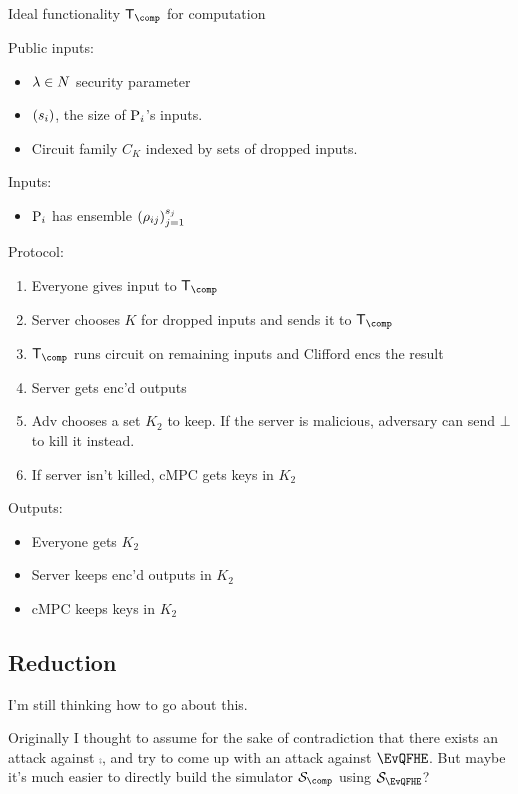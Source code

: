\begin{protocol}{Ideal functionality $\trustp_\comp$ for computation}

	Public inputs:
	\begin{itemize}
		\item $\lambda\in\relax{N}$ security parameter
		\item $\left(s_i\right)$, the size of $\operatorname{P}_i$'s inputs.
		\item Circuit family $C_K$ indexed by sets of dropped inputs.
	\end{itemize}

	Inputs:
	\begin{itemize}
		\item $\operatorname{P}_i$ has ensemble $\left(\rho_{ij}\right)_{j=1}^{s_j}$
	\end{itemize}

	Protocol:
	\begin{enumerate}
		\item Everyone gives input to $\trustp_\comp$
		\item Server chooses $K$ for dropped inputs and sends it to $\trustp_\comp$
		\item $\trustp_\comp$ runs circuit on remaining inputs and Clifford encs the result
		\item Server gets enc'd outputs
		\item Adv chooses a set $K_2$ to keep. If the server is malicious, adversary can send $\bot$ to kill it instead.
		\item If server isn't killed, cMPC gets keys in $K_2$
	\end{enumerate}

	Outputs:
	\begin{itemize}
		\item Everyone gets $K_2$
		\item Server keeps enc'd outputs in $K_2$
		\item cMPC keeps keys in $K_2$
	\end{itemize}
\end{protocol}

\subsection{Reduction}

I'm still thinking how to go about this.

Originally I thought to assume for the sake of contradiction that there exists an attack against $\comp$,
and try to come up with an attack against $\EvQFHE$.
But maybe it's much easier to directly build the simulator $\cS_\comp$ using $\cS_\EvQFHE$?
